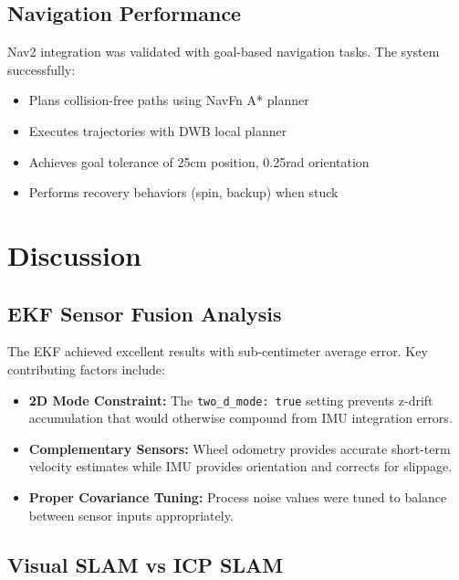 \documentclass[conference]{IEEEtran}
\begin{document}
\subsection{Navigation Performance}

Nav2 integration was validated with goal-based navigation tasks. The system successfully:
\begin{itemize}
    \item Plans collision-free paths using NavFn A* planner
    \item Executes trajectories with DWB local planner
    \item Achieves goal tolerance of 25cm position, 0.25rad orientation
    \item Performs recovery behaviors (spin, backup) when stuck
\end{itemize}

\section{Discussion}

\subsection{EKF Sensor Fusion Analysis}

The EKF achieved excellent results with sub-centimeter average error. Key contributing factors include:

\begin{itemize}
    \item \textbf{2D Mode Constraint:} The \texttt{two\_d\_mode: true} setting prevents z-drift accumulation that would otherwise compound from IMU integration errors.
    \item \textbf{Complementary Sensors:} Wheel odometry provides accurate short-term velocity estimates while IMU provides orientation and corrects for slippage.
    \item \textbf{Proper Covariance Tuning:} Process noise values were tuned to balance between sensor inputs appropriately.
\end{itemize}

\subsection{Visual SLAM vs ICP SLAM}
\end{document}
